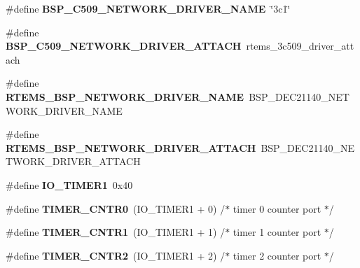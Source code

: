 \begin{DoxyCompactItemize}
\#define {\bfseries B\+S\+P\+\_\+C509\+\_\+\+N\+E\+T\+W\+O\+R\+K\+\_\+\+D\+R\+I\+V\+E\+R\+\_\+\+N\+A\+ME}~\char`\"{}3c1\char`\"{}
\item 
\mbox{\label{group__RTEMSBSPsI386_ga24da754eb7e9b645d059ad4940ff9df3}} 
\#define {\bfseries B\+S\+P\+\_\+C509\+\_\+\+N\+E\+T\+W\+O\+R\+K\+\_\+\+D\+R\+I\+V\+E\+R\+\_\+\+A\+T\+T\+A\+CH}~rtems\+\_\+3c509\+\_\+driver\+\_\+attach
\item 
\mbox{\label{group__RTEMSBSPsI386_ga86d4f9aa98431100692e31068070a8df}} 
\#define {\bfseries R\+T\+E\+M\+S\+\_\+\+B\+S\+P\+\_\+\+N\+E\+T\+W\+O\+R\+K\+\_\+\+D\+R\+I\+V\+E\+R\+\_\+\+N\+A\+ME}~B\+S\+P\+\_\+\+D\+E\+C21140\+\_\+\+N\+E\+T\+W\+O\+R\+K\+\_\+\+D\+R\+I\+V\+E\+R\+\_\+\+N\+A\+ME
\item 
\mbox{\label{group__RTEMSBSPsI386_gadde0d66aef9442971dde465292ac14e6}} 
\#define {\bfseries R\+T\+E\+M\+S\+\_\+\+B\+S\+P\+\_\+\+N\+E\+T\+W\+O\+R\+K\+\_\+\+D\+R\+I\+V\+E\+R\+\_\+\+A\+T\+T\+A\+CH}~B\+S\+P\+\_\+\+D\+E\+C21140\+\_\+\+N\+E\+T\+W\+O\+R\+K\+\_\+\+D\+R\+I\+V\+E\+R\+\_\+\+A\+T\+T\+A\+CH
\item 
\mbox{\label{group__RTEMSBSPsI386_ga95b5a23b2d1437404a4a197c0917dd86}} 
\#define {\bfseries I\+O\+\_\+\+T\+I\+M\+E\+R1}~0x40
\item 
\mbox{\label{group__RTEMSBSPsI386_gae1359cc58f6fb0c1a13fbad113912ba0}} 
\#define {\bfseries T\+I\+M\+E\+R\+\_\+\+C\+N\+T\+R0}~(I\+O\+\_\+\+T\+I\+M\+E\+R1 + 0) /$\ast$ timer 0 counter port           $\ast$/
\item 
\mbox{\label{group__RTEMSBSPsI386_ga00edac6bafad79d6bcb96fae7db7ba28}} 
\#define {\bfseries T\+I\+M\+E\+R\+\_\+\+C\+N\+T\+R1}~(I\+O\+\_\+\+T\+I\+M\+E\+R1 + 1) /$\ast$ timer 1 counter port           $\ast$/
\item 
\mbox{\label{group__RTEMSBSPsI386_ga341381414e02f0e90bb85b1739e75ee1}} 
\#define {\bfseries T\+I\+M\+E\+R\+\_\+\+C\+N\+T\+R2}~(I\+O\+\_\+\+T\+I\+M\+E\+R1 + 2) /$\ast$ timer 2 counter port           $\ast$/
\item 
\mbox{\label{group__RTEMSBSPsI386_gaf2a9f923fe45bcba36e26b19886d9d81}} 

\end{DoxyCompactItemize}
